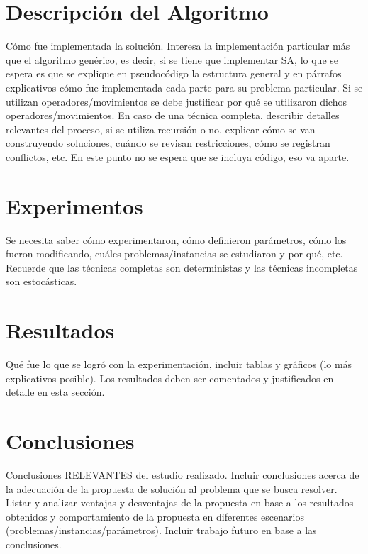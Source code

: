 \documentclass[letter, 10pt]{article}
\begin{document}
\section{Descripci\'on del Algoritmo}

C\'omo fue implementada la soluci\'on. Interesa la implementaci\'on particular m\'as que el algoritmo gen\'erico, es decir, si se tiene que implementar SA, lo que se espera es que se explique en pseudoc\'odigo la estructura general y en p\'arrafos explicativos c\'omo fue implementada cada parte para su problema particular. Si se utilizan operadores/movimientos se debe justificar por qu\'e se utilizaron dichos operadores/movimientos. En caso de una t\'ecnica completa, describir detalles relevantes del proceso, si se utiliza recursi\'on o no, explicar c\'omo se van construyendo soluciones, cu\'ando se revisan restricciones, c\'omo se registran conflictos, etc. En este punto no se espera que se incluya c\'odigo, eso va aparte.

\section{Experimentos}

Se necesita saber c\'omo experimentaron, c\'omo definieron par\'ametros, 
c\'omo los fueron modificando, cu\'ales problemas/instancias se estudiaron y por qu\'e, etc. Recuerde que las t\'ecnicas completas son deterministas y las t\'ecnicas incompletas son estoc\'asticas.

\section{Resultados}

Qu\'e fue lo que se logr\'o con la experimentaci\'on, incluir tablas y gr\'aficos (lo m\'as explicativos posible). Los resultados deben ser comentados y justificados en detalle en esta secci\'on.

\section{Conclusiones}

Conclusiones RELEVANTES del estudio realizado. Incluir conclusiones acerca de la adecuaci\'on de la propuesta de soluci\'on al problema que se busca resolver. Listar y analizar ventajas y desventajas de la propuesta en base a los resultados obtenidos y comportamiento de la propuesta en diferentes escenarios (problemas/instancias/par\'ametros). Incluir trabajo futuro en base a las conclusiones.
\vspace{0.2cm}
\end{document}
